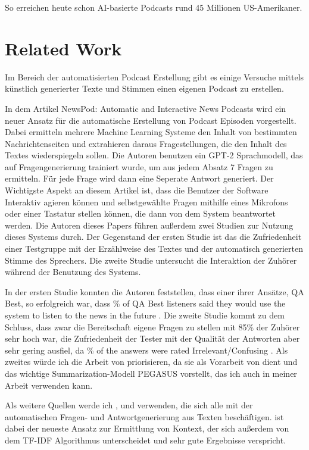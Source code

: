 So erreichen heute schon AI-basierte Podcasts rund 45 Millionen US-Amerikaner.

\section{Related Work}

Im Bereich der automatisierten Podcast Erstellung gibt es einige Versuche mittels künstlich generierter Texte und Stimmen einen eigenen Podcast zu erstellen.

In dem Artikel \glqq NewsPod: Automatic and Interactive News Podcasts\grqq{} \cite{laban2022} wird ein neuer Ansatz für die automatische Erstellung von Podcast Episoden vorgestellt. 
Dabei ermitteln mehrere Machine Learning Systeme den Inhalt von bestimmten Nachrichtenseiten und extrahieren daraus Fragestellungen, die den Inhalt des Textes wiederspiegeln sollen. Die Autoren benutzen ein GPT-2 Sprachmodell, das auf Fragengenerierung trainiert wurde, um aus jedem Absatz 7 Fragen zu ermitteln. 
Für jede Frage wird dann eine Seperate Antwort generiert. 
Der Wichtigste Aspekt an diesem Artikel ist, dass die Benutzer der Software Interaktiv agieren können und selbstgewählte Fragen mithilfe eines Mikrofons oder einer Tastatur stellen können, die dann von dem System beantwortet werden. 
Die Autoren dieses Papers führen außerdem zwei Studien zur Nutzung dieses Systems durch.
Der Gegenstand der ersten Studie ist das die Zufriedenheit einer Testgruppe mit der Erzählweise des Textes und der automatisch generierten Stimme des Sprechers. 
Die zweite Studie untersucht die Interaktion der Zuhörer während der Benutzung des Systems. 
\cite{laban2022}

In der ersten Studie konnten die Autoren feststellen, dass einer ihrer Ansätze, QA Best,  so erfolgreich war, dass \% of QA Best listeners said they would use the system to listen to the news in the future\grqq{}  \cite{laban2022}.
Die zweite Studie kommt zu dem Schluss, dass zwar die Bereitschaft eigene Fragen zu stellen mit 85\% der Zuhörer sehr hoch war, die Zufriedenheit der Tester mit der Qualität der Antworten aber sehr gering ausfiel, da \% of the answers were rated Irrelevant/Confusing\grqq{} \cite{laban2022}.
Als zweites würde ich die Arbeit von \cite{zhang2020} priorisieren, da sie als Vorarbeit von \cite{laban2022} dient und das wichtige Summarization-Modell PEGASUS vorstellt, das ich auch in meiner Arbeit verwenden kann.

Als weitere Quellen werde ich \cite{karpukhin2020}, \cite{reddy2019} und \cite{choi2018} verwenden, die sich alle mit der automatischen Fragen- und Antwortgenerierung aus Texten beschäftigen.
\cite{karpukhin2020} ist dabei der neueste Ansatz zur Ermittlung von Kontext, der sich außerdem von dem TF-IDF Algorithmus unterscheidet und sehr gute Ergebnisse verspricht.

